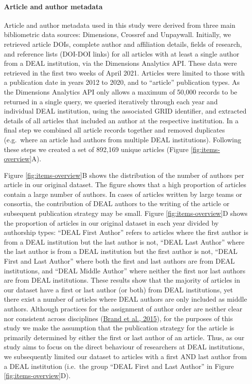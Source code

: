 \documentclass[
]{article}
\begin{document}
\hypertarget{article-and-author-metadata}{%
\paragraph{Article and author metadata}\label{article-and-author-metadata}}

Article and author metadata used in this study were derived from three main bibliometric data sources: Dimensions, Crossref and Unpaywall. Initially, we retrieved article DOIs, complete author and affiliation details, fields of research, and reference lists (DOI-DOI links) for all articles with at least a single author from a DEAL institution, via the Dimensions Analytics API. These data were retrieved in the first two weeks of April 2021. Articles were limited to those with a publication date in years 2012 to 2020, and to ``article'' publication types. As the Dimensions Analytics API only allows a maximum of 50,000 records to be returned in a single query, we queried iteratively through each year and individual DEAL institution, using the associated GRID identifier, and extracted details of all articles that included an author at the respective institution. In a final step we combined all article records together and removed duplicates (e.g.~where an article had authors from multiple DEAL institutions). Following these steps we created a set of 892,169 unique articles (Figure \ref{fig:items-overview}A).

Figure \ref{fig:items-overview}B shows the distribution of the number of authors per article in our original dataset. The figure shows that a high proportion of articles contain a large number of authors. In cases of articles written by large teams or consortia, the contribution of DEAL authors to the writing of the article or subsequent publication strategy may be small. Figure \ref{fig:items-overview}D shows the proportion of articles in our original dataset in each year divided by authorship types: ``DEAL First Author'' refers to articles where the first author is from a DEAL institution but the last author is not, ``DEAL Last Author'' where the last author is from a DEAL institution but the first author is not, ``DEAL First and Last Author'' where both the first and last authors are from DEAL institutions, and ``DEAL Middle Author'' where neither the first nor last authors are from DEAL institutions. These results show that the majority of articles in our dataset have a first or last author (or both) from DEAL institutions, yet there exist a number of articles where DEAL authors are only included as middle authors. Although practices for the assignment of author order are neither clear nor consistent across disciplines (\href{https://doi.org/10.1087/20150211}{Brand et al., 2015}), for the purposes of this study we make the assumption that the publication strategy for the article is primarily determined by either the first or last author of an article. Thus, as our study aims to focus on the direct behaviour of researchers at DEAL institutions, we subsequently limited our dataset to articles with a first AND last author from a DEAL institution (i.e.~the group ``DEAL First and Last Author'' in Figure \ref{fig:items-overview}D).
\end{document}
